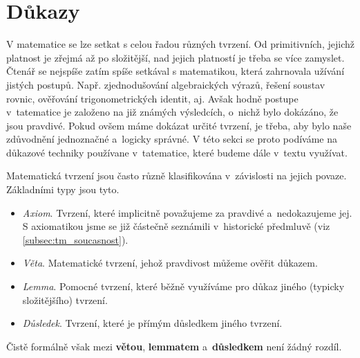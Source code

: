 \chapter{Důkazy}\label{chap:dukazy}
V matematice se lze setkat s celou řadou různých tvrzení. Od primitivních, jejichž platnost je zřejmá až po složitější, nad jejich platností je třeba se více zamyslet. Čtenář se nejspíše zatím spíše setkával s matematikou, která zahrnovala užívání jistých postupů. Např. zjednodušování algebraických výrazů, řešení soustav rovnic, ověřování trigonometrických identit, aj. Avšak hodně postupe v~tatematice je založeno na již známých výsledcích, o~nichž bylo dokázáno, že jsou pravdivé. Pokud ovšem máme dokázat určité tvrzení, je třeba, aby bylo naše zdůvodnění jednoznačné a~logicky správné. V této sekci se proto podíváme na důkazové techniky používane v~tatematice, které budeme dále v~textu využívat.\par
Matematická tvrzení jsou často různě klasifikována v~závislosti na jejich povaze. Základními typy jsou tyto. 
\begin{itemize}
    \item \emph{Axiom}. Tvrzení, které implicitně považujeme za pravdivé a~nedokazujeme jej. S axiomatikou jsme se již částečně seznámili v~historické předmluvě (viz \ref{subsec:tm_soucasnost}).
    \item \emph{Věta}. Matematické tvrzení, jehož pravdivost můžeme ověřit důkazem.
    \item \emph{Lemma}. Pomocné tvrzení, které běžně využíváme pro důkaz jiného (typicky složitějšího) tvrzení.
    \item \emph{Důsledek}. Tvrzení, které je přímým důsledkem jiného tvrzení.
\end{itemize}
Čistě formálně však mezi \textbf{větou}, \textbf{lemmatem} a~\textbf{důsledkem} není žádný rozdíl.

